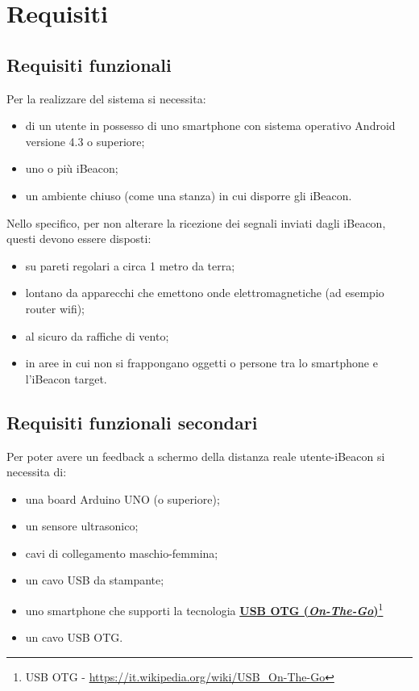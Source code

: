 \chapter{Requisiti}

\section{Requisiti funzionali}
Per la realizzare del sistema si necessita:
\begin{itemize}
	\item di un utente in possesso di uno smartphone con sistema operativo Android versione 4.3 o superiore;
	
	\item uno o più iBeacon;
	
	\item un ambiente chiuso (come una stanza) in cui disporre gli iBeacon.
\end{itemize}
Nello specifico, per non alterare la ricezione dei segnali inviati dagli iBeacon, questi devono essere disposti:
\begin{itemize}
	\item su pareti regolari a circa 1 metro da terra;
	
	\item lontano da apparecchi che emettono onde elettromagnetiche (ad esempio router wifi);
	
	\item al sicuro da raffiche di vento;
	
	\item in aree in cui non si frappongano oggetti o persone tra lo smartphone e l'iBeacon target.
\end{itemize}

\section{Requisiti funzionali secondari}
Per poter avere un feedback a schermo della distanza reale utente-iBeacon si necessita di:
\begin{itemize}
	\item una board Arduino UNO (o superiore);
	
	\item un sensore ultrasonico;
	
	\item cavi di collegamento maschio-femmina;
	
	\item un cavo USB da stampante;
	
	\item uno smartphone che supporti la tecnologia \href{https://it.wikipedia.org/wiki/USB_On-The-Go}{\textbf{USB OTG (\textit{On-The-Go})}}\footnote{USB OTG - \url{https://it.wikipedia.org/wiki/USB_On-The-Go}}
	
	\item un cavo USB OTG.
\end{itemize}

